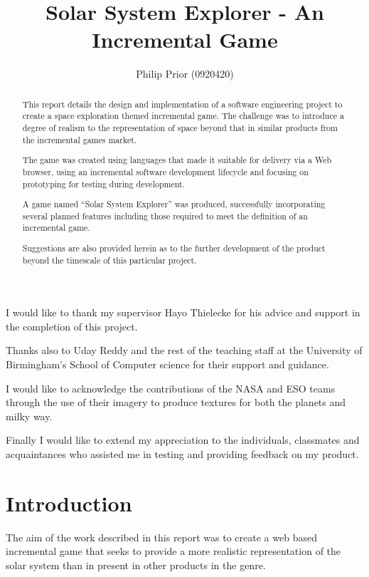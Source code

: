 \documentclass[twoside]{bhamthesis}
\title{Solar System Explorer - An Incremental Game}
\author{Philip Prior (0920420)}
\begin{document}
\maketitle
\clearemptydoublepage

\tableofcontents

\begin{abstract}

This report details the design and implementation of a software engineering project to create a space exploration themed incremental game. The challenge was to introduce a degree of realism to the representation of space beyond that in similar products from the incremental games market.

The game was created using languages that made it suitable for delivery via a Web browser, using an incremental software development lifecycle and focusing on prototyping for testing during development.

A game named “Solar System Explorer” was produced, successfully incorporating several planned features including those required to meet the definition of an incremental game.

Suggestions are also provided herein as to the further development of the product beyond the timescale of this particular project.

\end{abstract}

\begin{acknowledgments}
I would like to thank my supervisor Hayo Thielecke for his advice and support in the completion of this project.

Thanks also to Uday Reddy and the rest of the teaching staff at the University of Birmingham's School of Computer science for their support and guidance.

I would like to acknowledge the contributions of the NASA and ESO teams through the use of their imagery to produce textures for both the planets and milky way.

Finally I would like to extend my appreciation to the individuals, classmates and acquaintances who assisted me in testing and providing feedback on my product.
\end{acknowledgments}


\section{Introduction}

The aim of the work described in this report was to create a web based incremental game that seeks to provide a more realistic representation of the solar system than in present in other products in the genre.
\end{document}
